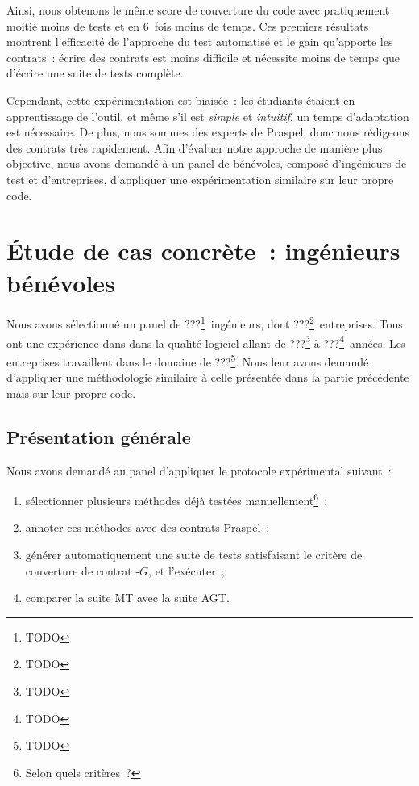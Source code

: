Ainsi, nous obtenons le même score de couverture du code avec pratiquement
moitié moins de tests et en 6~fois moins de temps. Ces premiers résultats
montrent l'efficacité de l'approche du test automatisé et le gain qu'apporte les
contrats~: écrire des contrats est moins difficile et nécessite moins de temps
que d'écrire une suite de tests complète.

Cependant, cette expérimentation est biaisée~: les étudiants étaient en
apprentissage de l'outil, et même s'il est {\em simple} et {\em intuitif}, un
temps d'adaptation est nécessaire. De plus, nous sommes des experts de Praspel,
donc nous rédigeons des contrats très rapidement. Afin d'évaluer notre approche
de manière plus objective, nous avons demandé à un panel de bénévoles, composé
d'ingénieurs de test et d'entreprises, d'appliquer une expérimentation similaire
sur leur propre code.

\section{Étude de cas concrète~: ingénieurs bénévoles}
\label{section:experimentation:real}

Nous avons sélectionné un panel de ???\footnote{TODO}~ingénieurs, dont
???\footnote{TODO}~entreprises. Tous ont une expérience dans dans la
qualité logiciel allant de ???\footnote{TODO} à ???\footnote{TODO}~années. Les
entreprises travaillent dans le domaine de ???\footnote{TODO}. Nous leur avons
demandé d'appliquer une méthodologie similaire à celle présentée dans la partie
précédente mais sur leur propre code.

\subsection{Présentation générale}

Nous avons demandé au panel d'appliquer le protocole expérimental suivant~:

\begin{enumerate}

\item sélectionner plusieurs méthodes déjà testées manuellement\footnote{Selon
quels critères~?}~;

\item annoter ces méthodes avec des contrats Praspel~;

\item générer automatiquement une suite de tests satisfaisant le critère de
couverture de contrat -$G$, et l'exécuter~;

\item comparer la suite MT avec la suite AGT.

\end{enumerate}

